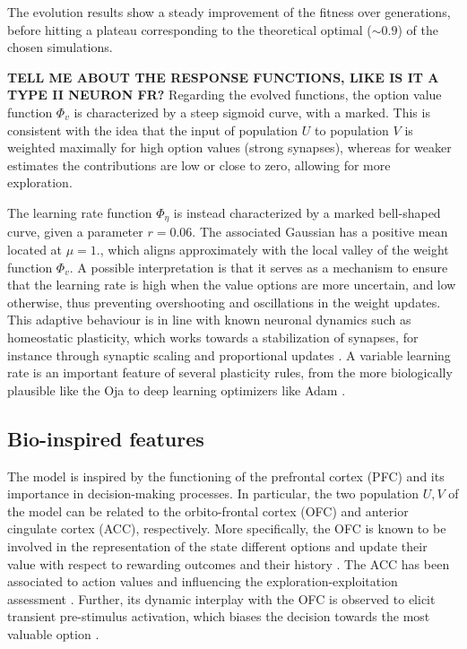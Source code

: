 \noindent The evolution results show a steady improvement of the fitness over generations, before hitting a plateau corresponding to the theoretical optimal ($\sim 0.9$) of the chosen simulations.

\textbf{TELL ME ABOUT THE RESPONSE FUNCTIONS, LIKE IS IT A TYPE II NEURON FR?} Regarding the evolved functions, the option value function $\Phi_{v}$ is characterized by a steep sigmoid curve, with a marked.
This is consistent with the idea that the input of population $U$ to population $V$ is weighted maximally for high option values (strong synapses), whereas for weaker estimates the contributions are low or close to zero, allowing for more exploration.

The learning rate function $\Phi_{\eta}$ is instead characterized by a marked bell-shaped curve, given a parameter $r=0.06$. The associated Gaussian has a positive mean located at $\mu=1.$, which aligns approximately with the local valley of the weight function $\Phi_{v}$.
A possible interpretation is that it serves as a mechanism to ensure that the learning rate is high when the value options are more uncertain, and low otherwise, thus preventing overshooting and oscillations in the weight updates.
This adaptive behaviour is in line with known neuronal dynamics such as homeostatic plasticity, which works towards a stabilization of synapses, for instance through synaptic scaling and proportional updates \cite{citriSynapticPlasticityMultiple2008}.
A variable learning rate is an important feature of several plasticity rules, from the more biologically plausible like the Oja \cite{ojaOjaLearningRule2008} to deep learning optimizers like Adam \cite{kingmaAdamMethodStochastic2017}.


\subsection{Bio-inspired features}

The model is inspired by the functioning of the prefrontal cortex (PFC) and its importance in decision-making processes. In particular, the two population $U, V$ of the model can be related to the orbito-frontal cortex (OFC) and anterior cingulate cortex (ACC), respectively.
More specifically, the OFC is known to be involved in the representation of the state different options and update their value with respect to rewarding outcomes and their history \cite{lukChoiceCodingFrontal2013, kennerleyDecisionMakingReward2011a}.
The ACC has been associated to action values and influencing the exploration-exploitation assessment \cite{khamassiChapter22Medial2013}. Further, its dynamic interplay with the OFC is observed to elicit transient pre-stimulus activation, which biases the decision towards the most valuable option \cite{funahashiPrefrontalContributionDecisionMaking2017, marcosDeterminingMonkeyFree2016, balewskiValueDynamicsAffect2023}.

